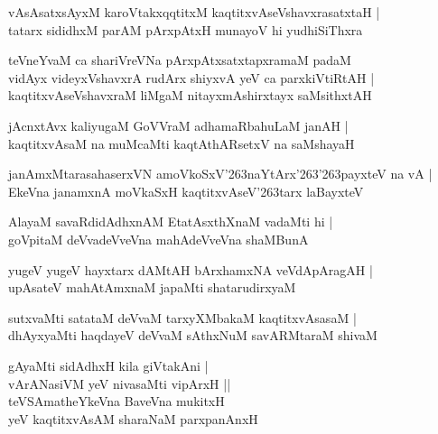 \documentclass[twoside,12pt,openright]{book}
\def\S{\char'263}
\newcounter{shloka}[chapter]
\begin{document}
\begin{shloka}
vAsAsatxsAyxM karoVtakxqqtitxM kaqtitxvAseVshavxrasatxtaH |\\
tatarx sididhxM parAM pArxpAtxH munayoV hi yudhiSiThxra 
\end{shloka}

\begin{shloka}
teVneYvaM ca shariVreVNa pArxpAtxsatxtapxramaM padaM \\
vidAyx videyxVshavxrA rudArx shiyxvA yeV ca parxkiVtiRtAH |\\
kaqtitxvAseVshavxraM liMgaM nitayxmAshirxtayx saMsithxtAH 
\end{shloka}

\begin{shloka}
jAcnxtAvx kaliyugaM GoVVraM adhamaRbahuLaM janAH |\\
kaqtitxvAsaM na muMcaMti kaqtAthARsetxV na saMshayaH 
\end{shloka}

\begin{shloka}
janAmxMtarasahaserxVN amoVkoSxV\S naYtArx\S\S payxteV na vA |\\
EkeVna janamxnA moVkaSxH kaqtitxvAseV\S tarx laBayxteV 
\end{shloka}

\begin{shloka}
AlayaM savaRdidAdhxnAM EtatAsxthXnaM vadaMti hi |\\
goVpitaM deVvadeVveVna mahAdeVveVna shaMBunA 
\end{shloka}

\begin{shloka}
yugeV yugeV hayxtarx dAMtAH bArxhamxNA veVdApAragAH |\\
upAsateV mahAtAmxnaM japaMti shatarudirxyaM 
\end{shloka}

\begin{shloka}
sutxvaMti satataM deVvaM tarxyXMbakaM kaqtitxvAsasaM |\\
dhAyxyaMti haqdayeV deVvaM sAthxNuM savARMtaraM shivaM 
\end{shloka}

\begin{shloka}
gAyaMti sidAdhxH kila giVtakAni |\\
vArANasiVM yeV nivasaMti vipArxH ||\\
teVSAmatheYkeVna BaveVna mukitxH \\
yeV kaqtitxvAsAM sharaNaM parxpanAnxH \\
\end{shloka}
\end{document}
